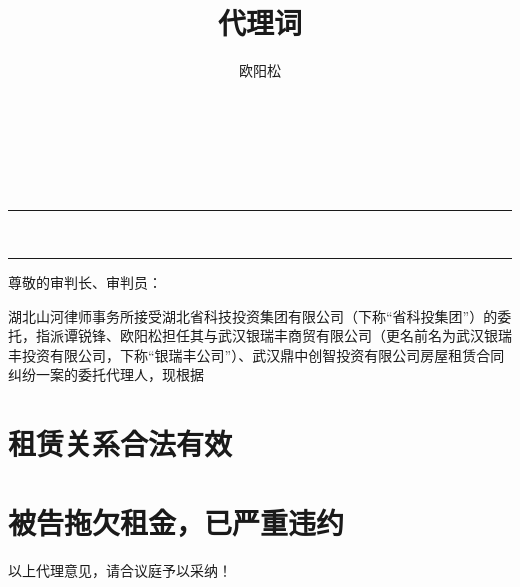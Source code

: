 \documentclass[fontset=none,zihao=-4,linespread=1.4]{ctexart}
\author{欧阳松}
\date{\zhtoday}
\title{代理词}
\begin{document}
\pagestyle{fancy}
\begin{spacing}{1}
\begin{center}
\noindent {}\\
\vspace{.8ex}
\\
\vspace{5ex}
\\
\vspace{3ex}

\noindent\rule{\textwidth}{0.6pt}\vspace*{-\baselineskip}\vspace*{2pt}\\ %
	\rule{\textwidth}{1.6pt} %
\end{center}
\end{spacing}

\large
\noindent 尊敬的审判长、审判员： \par
\vspace{1ex}

湖北山河律师事务所接受湖北省科技投资集团有限公司（下称“省科投集团”）的委托，指派谭锐锋、欧阳松担任其与武汉银瑞丰商贸有限公司（更名前名为武汉银瑞丰投资有限公司，下称“银瑞丰公司”）、武汉鼎中创智投资有限公司房屋租赁合同纠纷一案的委托代理人，现根据

\section{租赁关系合法有效}


\section{被告拖欠租金，已严重违约}



\vspace{3ex}
以上代理意见，请合议庭予以采纳！
\vspace{5ex}



\hfill {}\par
\vspace{2ex}
\hfill {}\par
\vspace{2ex}
\hfill \makebox[10em][c]{\zhtoday}

\end{document}

